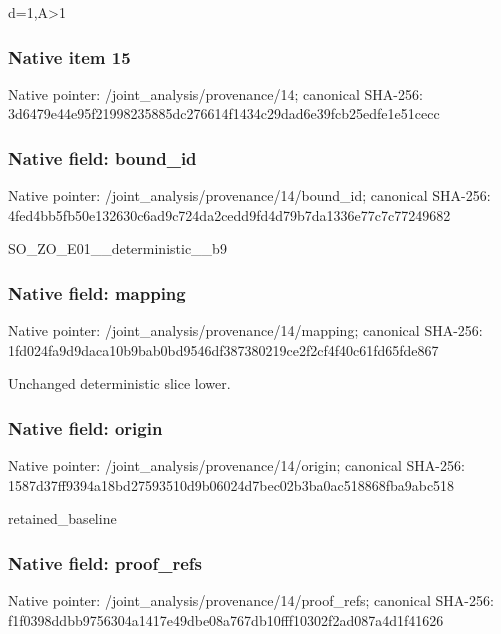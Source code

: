 \documentclass[10pt,a4paper]{article}
\begin{document}
\begingroup\raggedright\sloppy d=\allowbreak{}1,\allowbreak{}A>1\par\endgroup

\subsubsection{Native item 15}
Native pointer: /joint\_\allowbreak{}analysis/provenance/14; canonical SHA-256: 3d6479e44e95f21998235885dc276614f1434c29dad6e39fcb25edfe1e51cecc

\subsubsection{Native field: bound\_\allowbreak{}id}
Native pointer: /joint\_\allowbreak{}analysis/provenance/14/bound\_\allowbreak{}id; canonical SHA-256: 4fed4bb5fb50e132630c6ad9c724da2cedd9fd4d79b7da1336e77c7c77249682

\begingroup\raggedright\sloppy SO\_\allowbreak{}ZO\_\allowbreak{}E01\_\allowbreak{}\_\allowbreak{}deterministic\_\allowbreak{}\_\allowbreak{}b9\par\endgroup

\subsubsection{Native field: mapping}
Native pointer: /joint\_\allowbreak{}analysis/provenance/14/mapping; canonical SHA-256: 1fd024fa9d9daca10b9bab0bd9546df387380219ce2f2cf4f40c61fd65fde867

\begingroup\raggedright\sloppy Unchanged deterministic slice lower.\par\endgroup

\subsubsection{Native field: origin}
Native pointer: /joint\_\allowbreak{}analysis/provenance/14/origin; canonical SHA-256: 1587d37ff9394a18bd27593510d9b06024d7bec02b3ba0ac518868fba9abc518

\begingroup\raggedright\sloppy retained\_\allowbreak{}baseline\par\endgroup

\subsubsection{Native field: proof\_\allowbreak{}refs}
Native pointer: /joint\_\allowbreak{}analysis/provenance/14/proof\_\allowbreak{}refs; canonical SHA-256: f1f0398ddbb9756304a1417e49dbe08a767db10fff10302f2ad087a4d1f41626
\end{document}

